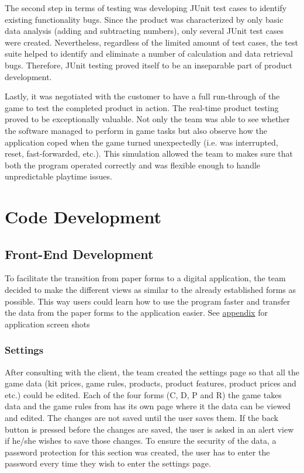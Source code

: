 \documentclass{l3proj}
\begin{document}
The second step in terms of testing was developing JUnit test cases to identify existing functionality bugs. Since the product was characterized by only basic data analysis (adding and subtracting numbers), only several JUnit test cases were created. Nevertheless, regardless of the limited amount of test cases, the test suite helped to identify and eliminate a number of calculation and data retrieval bugs. Therefore, JUnit testing proved itself to be an inseparable part of product development.

Lastly, it was negotiated with the customer to have a full run-through of the game to test the completed product in action. The real-time product testing proved to be exceptionally valuable. Not only the team was able to see whether the software managed to perform in game tasks but also observe how the application coped when the game turned unexpectedly (i.e. was interrupted, reset, fast-forwarded, etc.). This simulation allowed the team to makes sure that both the program operated correctly and was flexible enough to handle unpredictable playtime issues.
\section{Code Development}
\label{sec:development}
\subsection{Front-End Development}

To facilitate the transition from paper forms to a digital application, the team decided to make the different views as similar to the already established forms as possible. This way users could learn how to use the program faster and transfer the data from the paper forms to the application easier. See \hyperref[sec:appendix]{appendix} for application screen shots

\subsubsection{Settings}
After consulting with the client, the team created the settings page so that all the game data (kit prices, game rules, products, product features, product prices and etc.) could be edited. Each of the four forms (C, D, P and R) the game takes data and the game rules from has its own page where it the data can be viewed and edited. The changes are not saved until the user saves them. If the back button is pressed before the changes are saved, the user is asked in an alert view if he/she wishes to save those changes. To ensure the security of the data, a password protection for this section was created, the user has to enter the password every time they wish to enter the settings page.
\end{document}
